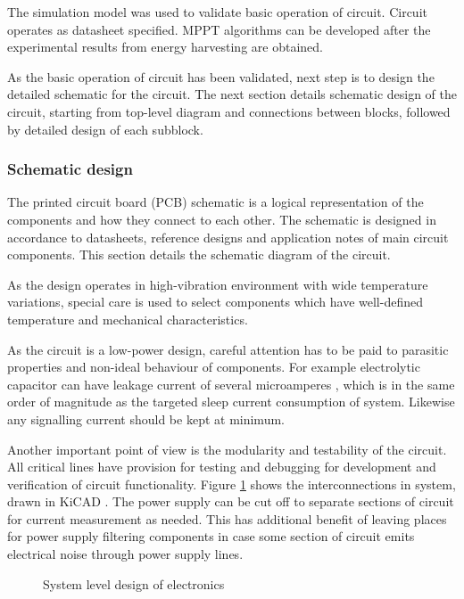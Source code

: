 The simulation model was used to validate basic operation of circuit. Circuit operates as datasheet specified. MPPT algorithms can be developed after the experimental results from energy harvesting are obtained. 

As the basic operation of circuit has been validated, next step is to design the detailed schematic for the circuit. The next section details schematic design of the circuit, starting from top-level diagram and connections between blocks, followed by detailed design of each subblock. 

\subsubsection{Schematic design}
The printed circuit board (PCB) schematic is a logical representation of the components and how they connect to each other. The schematic is designed in accordance to datasheets, reference designs and application notes of main circuit components. This section details the schematic diagram of the circuit.

As the design operates in high-vibration environment with wide temperature variations, special care is used to select components which have well-defined temperature and mechanical characteristics. 

As the circuit is a low-power design, careful attention has to be paid to parasitic properties and non-ideal behaviour of components. For example electrolytic capacitor can have leakage current of several microamperes \cite{Both2001}, which is in the same order of magnitude as the targeted sleep current consumption of system. Likewise any signalling current should be kept at minimum. 

Another important point of view is the modularity and testability of the circuit. All critical lines have provision for testing and debugging for development and verification of circuit functionality. Figure \ref{fig:circuit_blocklevel} shows the interconnections in system, drawn in KiCAD \cite{KiCAD}.  The power supply can be cut off to separate sections of circuit for current measurement as needed. This has additional benefit of leaving places for power supply filtering components in case some section of circuit emits electrical noise through power supply lines.

\begin{figure}
    \centering
    \def\svgwidth{\columnwidth}
    
    \caption{\label{fig:circuit_blocklevel} System level design of electronics}
\end{figure}

